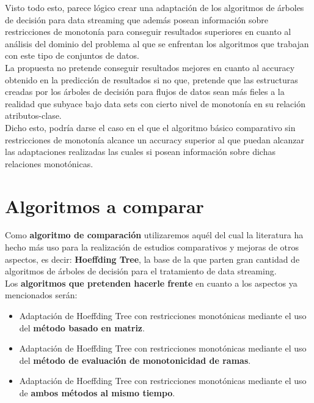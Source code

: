 Visto todo esto, parece lógico crear una adaptación de los algoritmos de árboles de decisión para data streaming que además posean información sobre restricciones de monotonía para conseguir resultados superiores en cuanto al análisis del dominio del problema al que se enfrentan los algoritmos que trabajan con este tipo de conjuntos de datos.\\

La propuesta no pretende conseguir resultados mejores en cuanto al accuracy obtenido en la predicción de resultados si no que, pretende que las estructuras creadas por los árboles de decisión para flujos de datos sean más fieles a la realidad que subyace bajo data sets con cierto nivel de monotonía en su relación atributos-clase.\\

Dicho esto, podría darse el caso en el que el algoritmo básico comparativo sin restricciones de monotonía alcance un accuracy superior al que puedan alcanzar las adaptaciones realizadas las cuales si posean información sobre dichas relaciones monotónicas.\\

\section{Algoritmos a comparar}

Como \textbf{algoritmo de comparación} utilizaremos aquél del cual la literatura ha hecho más uso para la realización de estudios comparativos y mejoras de otros aspectos, es decir: \textbf{Hoeffding Tree}, la base de la que parten gran cantidad de algoritmos de árboles de decisión para el tratamiento de data streaming.\\

Los \textbf{algoritmos que pretenden hacerle frente} en cuanto a los aspectos ya mencionados serán:
\begin{itemize}
	\item Adaptación de Hoeffding Tree con restricciones monotónicas mediante el uso del \textbf{método basado en matriz}.
	\item Adaptación de Hoeffding Tree con restricciones monotónicas mediante el uso del \textbf{método de evaluación de monotonicidad de ramas}.
	\item Adaptación de Hoeffding Tree con restricciones monotónicas mediante el uso de\textbf{ ambos métodos al mismo tiempo}.
\end{itemize}











\newpage


